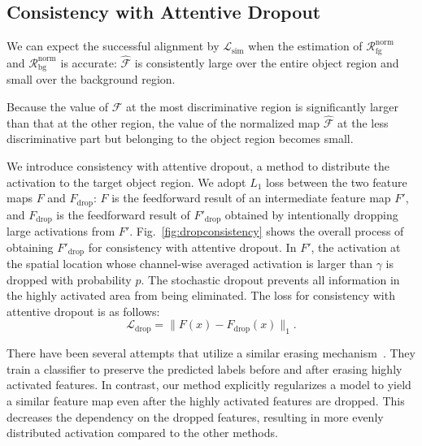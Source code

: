 \subsection{Consistency with Attentive Dropout}\label{sec:consistency_drop}
We can expect the successful alignment by $\mathcal{L}_\text{sim}$ when the estimation of $\mathcal{R}^\text{norm}_\text{fg}$ and $\mathcal{R}^\text{norm}_\text{bg}$ is accurate: $\hat{\mathcal{F}}$ is consistently large over the entire object region and small over the background region.

Because the value of $\mathcal{F}$ at the most discriminative region is significantly larger than that at the other region, the value of the normalized map $\hat{\mathcal{F}}$ at the less discriminative part but belonging to the object region becomes small.

We introduce consistency with attentive dropout, a method to distribute the activation to the target object region.
We adopt $L_1$ loss between the two feature maps $F$ and $F_\text{drop}$: $F$ is the feedforward result of an intermediate feature map $F'$, and $F_\text{drop}$ is the feedforward result of $F'_\text{drop}$ obtained by intentionally dropping large activations from $F'$.
Fig.~\ref{fig:dropconsistency} shows the overall process of obtaining $F'_\text{drop}$ for consistency with attentive dropout.
In $F'$, the activation at the spatial location whose channel-wise averaged activation is larger than $\gamma$ is dropped with probability $p$. The stochastic dropout prevents all information in the highly activated area from being eliminated. The loss for consistency with attentive dropout is as follows:
\begin{equation}\label{eq:loss_er}
\mathcal{L}_\text{drop} = \|F(x)- F_\text{drop}(x)\|_{1}.
\end{equation}

There have been several attempts that utilize a similar erasing mechanism~\cite{mai2020erasing,choe2019attention,zhang2018adversarial}.
They train a classifier to preserve the predicted labels before and after erasing highly activated features.
In contrast, our method explicitly regularizes a model to yield a similar feature map even after the highly activated features are dropped.
This decreases the dependency on the dropped features, resulting in more evenly distributed activation compared to the other methods.

